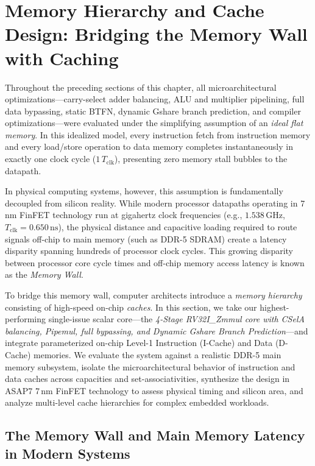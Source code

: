 \section{Memory Hierarchy and Cache Design: Bridging the Memory Wall with Caching}\label{riscvCaching}

Throughout the preceding sections of this chapter, all microarchitectural optimizations---carry-select adder balancing, ALU and multiplier pipelining, full data bypassing, static BTFN, dynamic Gshare branch prediction, and compiler optimizations---were evaluated under the simplifying assumption of an \textit{ideal flat memory}. In this idealized model, every instruction fetch from instruction memory and every load/store operation to data memory completes instantaneously in exactly one clock cycle ($1\,T_{\text{clk}}$), presenting zero memory stall bubbles to the datapath.

In physical computing systems, however, this assumption is fundamentally decoupled from silicon reality. While modern processor datapaths operating in 7\,nm FinFET technology run at gigahertz clock frequencies (e.g., $1.538\,\text{GHz}$, $T_{\text{clk}} = 0.650\,\text{ns}$), the physical distance and capacitive loading required to route signals off-chip to main memory (such as DDR-5 SDRAM) create a latency disparity spanning hundreds of processor clock cycles. This growing disparity between processor core cycle times and off-chip memory access latency is known as the \textit{Memory Wall}.

To bridge this memory wall, computer architects introduce a \textit{memory hierarchy} consisting of high-speed on-chip \textit{caches}. In this section, we take our highest-performing single-issue scalar core---the \textit{4-Stage RV32I\_Zmmul core with CSelA balancing, Pipemul, full bypassing, and Dynamic Gshare Branch Prediction}---and integrate parameterized on-chip Level-1 Instruction (I-Cache) and Data (D-Cache) memories. We evaluate the system against a realistic DDR-5 main memory subsystem, isolate the microarchitectural behavior of instruction and data caches across capacities and set-associativities, synthesize the design in ASAP7 7\,nm FinFET technology to assess physical timing and silicon area, and analyze multi-level cache hierarchies for complex embedded workloads.

\subsection{The Memory Wall and Main Memory Latency in Modern Systems}

